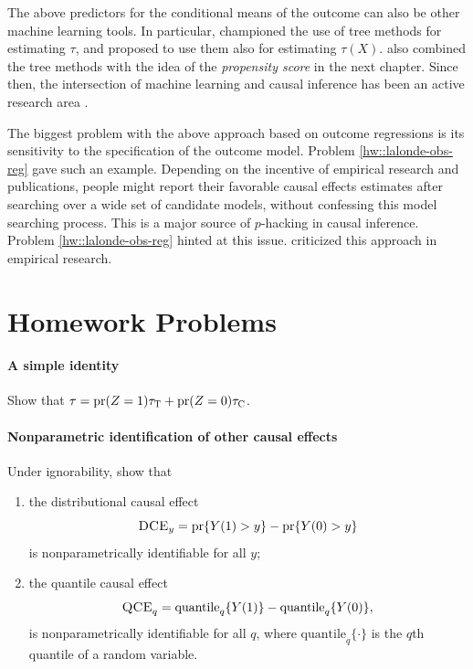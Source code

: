  

The above predictors for the conditional means of the outcome can also be other machine learning tools. In particular, 
\citet{hill2011bayesian} championed the use of tree methods for estimating $\tau$, and \citet{wager2018estimation} proposed to use them also for estimating $\tau(X) $. \citet{wager2018estimation}  also combined the tree methods with the idea of the {\it propensity score} in the next chapter. Since then, the intersection of machine learning and causal inference has been an active research area \citep[e.g.,][]{hahn2020bayesian, kunzel2019metalearners}. 


The biggest problem with the above approach based on outcome regressions is its sensitivity to the specification of the outcome model. Problem \ref{hw::lalonde-obs-reg} gave such an example. Depending on the incentive of empirical research and publications, people might report their favorable causal effects estimates after searching over a wide set of candidate models, without confessing this model searching process. This is a major source of $p$-hacking in causal inference. Problem \ref{hw::lalonde-obs-reg} hinted at this issue. \citet{leamer1978specification} criticized this approach in empirical research.  

 


\section{Homework Problems}


\paragraph{A simple identity}\label{hw::simple-identity-taus}

Show that $\tau = \textup{pr}(Z=1) \tau_\textsc{T} + \textup{pr}(Z=0)\tau_\textsc{C}$. 


\paragraph{Nonparametric identification of other causal effects}\label{hw::nonparametric-identification-dce-qce}

Under ignorability, show that
\begin{enumerate}
\item
 the distributional causal effect
 $$
\textsc{DCE}_y = \textup{pr}\{  Y(1) > y  \} - \textup{pr}\{ Y(0) > y \} 
$$
is nonparametrically identifiable for all $y$;
\item
the quantile causal effect 
$$
\textsc{QCE}_q = \text{quantile}_q\{ Y(1) \} - \text{quantile}_q\{ Y(0) \},
$$
is nonparametrically identifiable for all $q$, where $\text{quantile}_q\{ \cdot \} $ is the $q$th quantile of a random variable. 
\end{enumerate}



